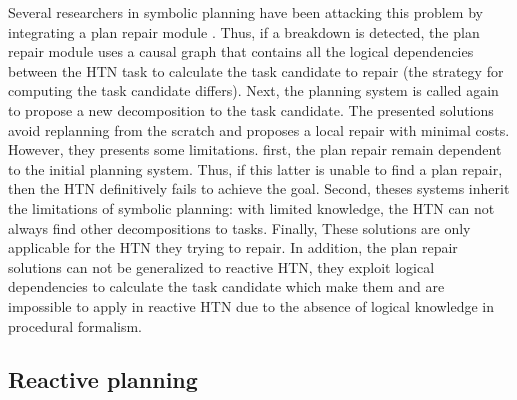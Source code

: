 \documentclass[conference]{IEEEtran}
\begin{document}
		Several researchers in symbolic planning have been attacking this problem by integrating a plan repair module \cite{boella2002replanning, van2005plan,hayashi2006dynagent,ayan2007hotride,warfield2007adaptation}. Thus, if a breakdown is detected, the plan repair module uses a causal graph that contains all the logical dependencies between the HTN task  to calculate the task candidate to repair (the strategy for computing the task candidate differs). Next, the planning system is called again to propose a new decomposition to the  task candidate.
		 The presented solutions avoid replanning from the scratch and proposes a local repair with minimal costs. However, they presents some limitations. first, the plan repair remain dependent to the initial planning system. Thus, if this latter is unable to find a plan repair, then the HTN definitively fails to achieve the goal. Second, theses systems inherit the limitations of symbolic planning: with limited knowledge, the HTN can not always find other decompositions to tasks. Finally,  These solutions are only applicable for the HTN they trying to repair. In addition, the plan repair solutions can not be generalized to reactive HTN, they exploit  logical dependencies to calculate the task candidate which make them and are impossible to apply in reactive HTN due to the absence of logical knowledge in procedural formalism.
	\subsection{Reactive planning}
\end{document}
